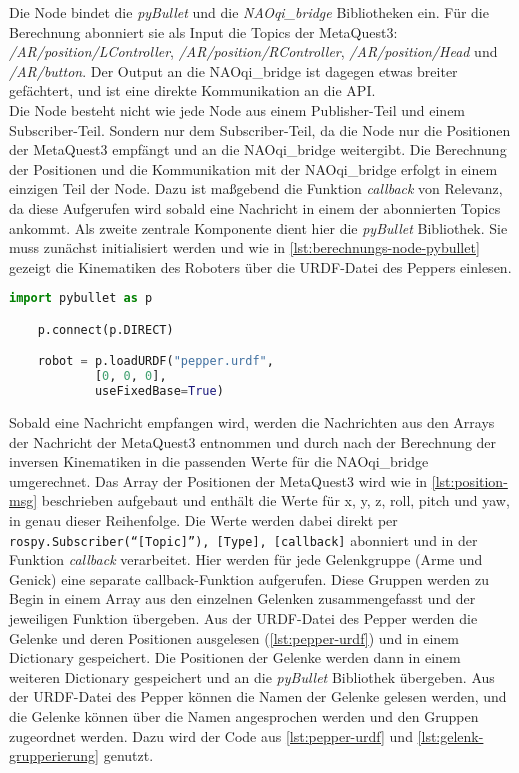 \noindent
Die Node bindet die \textit{pyBullet} und die \textit{NAOqi\_bridge} Bibliotheken ein. Für die Berechnung abonniert sie als Input die Topics der MetaQuest3: \textit{/AR/position/LController}, \textit{/AR/position/RController}, \textit{/AR/position/Head} und \textit{/AR/button}. Der Output an die NAOqi\_bridge ist dagegen etwas breiter gefächtert, und ist eine direkte Kommunikation an die \ac{API}.
\\

\noindent
Die Node besteht nicht wie jede Node aus einem Publisher-Teil und einem Subscriber-Teil. Sondern nur dem Subscriber-Teil, da die Node nur die Positionen der MetaQuest3 empfängt und an die NAOqi\_bridge weitergibt. Die Berechnung der Positionen und die Kommunikation mit der NAOqi\_bridge erfolgt in einem einzigen Teil der Node. Dazu ist maßgebend die Funktion \textit{callback} von Relevanz, da diese Aufgerufen wird sobald eine Nachricht in einem der abonnierten Topics ankommt. Als zweite zentrale Komponente dient hier die \textit{pyBullet} Bibliothek. Sie muss zunächst initialisiert werden und wie in \autoref{lst:berechnungs-node-pybullet} gezeigt die Kinematiken des Roboters über die \ac{URDF}-Datei des Peppers einlesen.
\\

\noindent
\begin{lstlisting}[language=Python, caption=Berechnungs-Node-Initialisierung von PyBullet, label=lst:berechnungs-node-pybullet]
    import pybullet as p

    p.connect(p.DIRECT)

    robot = p.loadURDF("pepper.urdf",
            [0, 0, 0],
            useFixedBase=True)
\end{lstlisting}
Sobald eine Nachricht empfangen wird, werden die Nachrichten aus den Arrays der Nachricht der MetaQuest3 entnommen und durch nach der Berechnung der inversen Kinematiken in die passenden Werte für die NAOqi\_bridge umgerechnet. Das Array der Positionen der MetaQuest3 wird wie in \autoref{lst:position-msg} beschrieben aufgebaut und enthält die Werte für x, y, z, roll, pitch und yaw, in genau dieser Reihenfolge. Die Werte werden dabei direkt per \texttt{rospy.Subscriber(``[Topic]''), [Type], [callback]} abonniert und in der Funktion \textit{callback} verarbeitet. Hier werden für jede Gelenkgruppe (Arme und Genick) eine separate callback-Funktion aufgerufen. Diese Gruppen werden zu Begin in einem Array aus den einzelnen Gelenken zusammengefasst und der jeweiligen Funktion übergeben. Aus der \ac{URDF}-Datei des Pepper werden die Gelenke und deren Positionen ausgelesen (\autoref{lst:pepper-urdf}) und in einem Dictionary gespeichert. Die Positionen der Gelenke werden dann in einem weiteren Dictionary gespeichert und an die \textit{pyBullet} Bibliothek übergeben. Aus der \ac{URDF}-Datei des Pepper können die Namen der Gelenke gelesen werden, und die Gelenke können über die Namen angesprochen werden und den Gruppen zugeordnet werden. Dazu wird der Code aus \autoref{lst:pepper-urdf} und \autoref{lst:gelenk-grupperierung} genutzt.
\\

